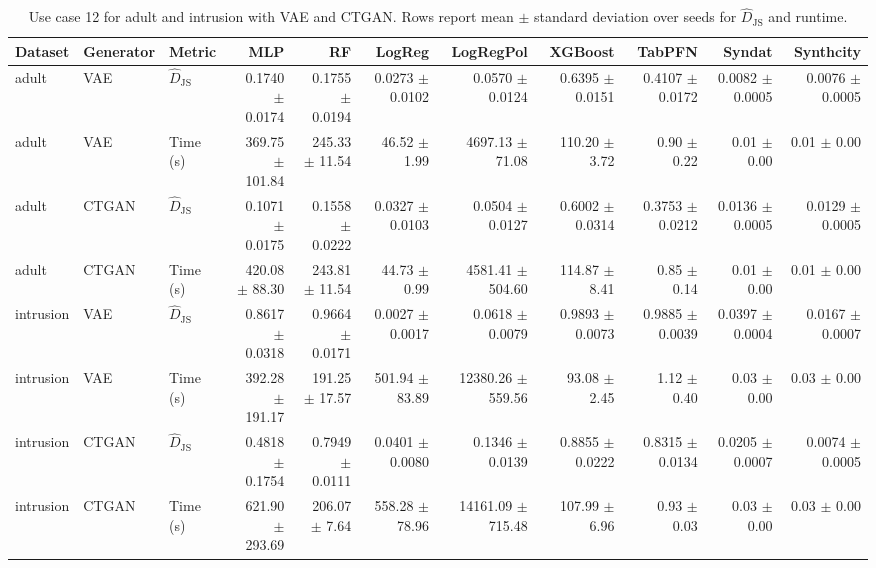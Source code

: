 \begin{table}[ht]
\centering
\scriptsize
\setlength{\tabcolsep}{2.2pt}
\caption{Use case 12 for adult and intrusion with VAE and CTGAN. Rows report mean $\pm$ standard deviation over seeds for $\widehat{D}_{\mathrm{JS}}$ and runtime.}
\label{tab:uc12_adult_intrusion_vae_ctgan_mean_std}
\begin{tabular}{lllrrrrrrrr}
\toprule
Dataset & Generator & Metric & MLP & RF & LogReg & LogRegPol & XGBoost & TabPFN & Syndat & Synthcity \\
\midrule
adult & VAE & $\widehat{D}_{\mathrm{JS}}$ & 0.1740 $\pm$ 0.0174 & 0.1755 $\pm$ 0.0194 & 0.0273 $\pm$ 0.0102 & 0.0570 $\pm$ 0.0124 & 0.6395 $\pm$ 0.0151 & 0.4107 $\pm$ 0.0172 & 0.0082 $\pm$ 0.0005 & 0.0076 $\pm$ 0.0005 \\
adult & VAE & Time (s) & 369.75 $\pm$ 101.84 & 245.33 $\pm$ 11.54 & 46.52 $\pm$ 1.99 & 4697.13 $\pm$ 71.08 & 110.20 $\pm$ 3.72 & 0.90 $\pm$ 0.22 & 0.01 $\pm$ 0.00 & 0.01 $\pm$ 0.00 \\
adult & CTGAN & $\widehat{D}_{\mathrm{JS}}$ & 0.1071 $\pm$ 0.0175 & 0.1558 $\pm$ 0.0222 & 0.0327 $\pm$ 0.0103 & 0.0504 $\pm$ 0.0127 & 0.6002 $\pm$ 0.0314 & 0.3753 $\pm$ 0.0212 & 0.0136 $\pm$ 0.0005 & 0.0129 $\pm$ 0.0005 \\
adult & CTGAN & Time (s) & 420.08 $\pm$ 88.30 & 243.81 $\pm$ 11.54 & 44.73 $\pm$ 0.99 & 4581.41 $\pm$ 504.60 & 114.87 $\pm$ 8.41 & 0.85 $\pm$ 0.14 & 0.01 $\pm$ 0.00 & 0.01 $\pm$ 0.00 \\
intrusion & VAE & $\widehat{D}_{\mathrm{JS}}$ & 0.8617 $\pm$ 0.0318 & 0.9664 $\pm$ 0.0171 & 0.0027 $\pm$ 0.0017 & 0.0618 $\pm$ 0.0079 & 0.9893 $\pm$ 0.0073 & 0.9885 $\pm$ 0.0039 & 0.0397 $\pm$ 0.0004 & 0.0167 $\pm$ 0.0007 \\
intrusion & VAE & Time (s) & 392.28 $\pm$ 191.17 & 191.25 $\pm$ 17.57 & 501.94 $\pm$ 83.89 & 12380.26 $\pm$ 559.56 & 93.08 $\pm$ 2.45 & 1.12 $\pm$ 0.40 & 0.03 $\pm$ 0.00 & 0.03 $\pm$ 0.00 \\
intrusion & CTGAN & $\widehat{D}_{\mathrm{JS}}$ & 0.4818 $\pm$ 0.1754 & 0.7949 $\pm$ 0.0111 & 0.0401 $\pm$ 0.0080 & 0.1346 $\pm$ 0.0139 & 0.8855 $\pm$ 0.0222 & 0.8315 $\pm$ 0.0134 & 0.0205 $\pm$ 0.0007 & 0.0074 $\pm$ 0.0005 \\
intrusion & CTGAN & Time (s) & 621.90 $\pm$ 293.69 & 206.07 $\pm$ 7.64 & 558.28 $\pm$ 78.96 & 14161.09 $\pm$ 715.48 & 107.99 $\pm$ 6.96 & 0.93 $\pm$ 0.03 & 0.03 $\pm$ 0.00 & 0.03 $\pm$ 0.00 \\
\bottomrule
\end{tabular}
\end{table}